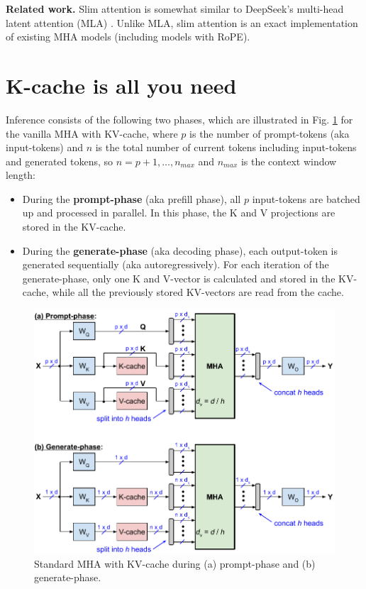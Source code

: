 \documentclass{article}
\begin{document}
\textbf{Related work.} Slim attention is somewhat similar to DeepSeek’s multi-head latent attention (MLA) \citep{deepseek-v2}. Unlike MLA, slim attention is an exact implementation of existing MHA models (including models with RoPE).

\section{K-cache is all you need}
Inference consists of the following two phases, which are illustrated in Fig. \ref{fig2} for the vanilla MHA with KV-cache, where $p$ is the number of prompt-tokens (aka input-tokens) and $n$ is the total number of current tokens including input-tokens and generated tokens, so $n = p+1, \ldots, n_{max}$ and $n_{max}$ is the context window length:
\begin{itemize}[topsep=-1pt, itemsep=-1pt]
  \item During the \textbf{prompt-phase} (aka prefill phase), all $p$ input-tokens are batched up and processed in parallel. In this phase, the K and V projections are stored in the KV-cache.
  \item During the \textbf{generate-phase} (aka decoding phase), each output-token is generated sequentially (aka autoregressively). For each iteration of the generate-phase, only one K and V-vector is calculated and stored in the KV-cache, while all the previously stored KV-vectors are read from the cache.
\end{itemize}
\begin{figure}[h!] \centering
  \includegraphics[scale=0.88]{../doc/fig/slimAttn_fig2.pdf}
  \caption{Standard MHA with KV-cache during (a) prompt-phase and (b) generate-phase.}
\label{fig2} \end{figure}
\end{document}
